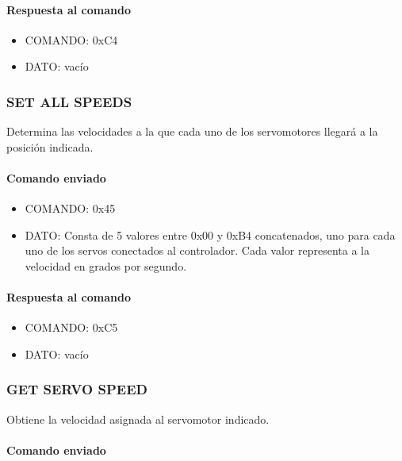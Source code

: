 \paragraph*{Respuesta al comando}

\begin{itemize}
	\item{COMANDO:} 0xC4
	\item{DATO:} vac\'io
\end{itemize}

\subsubsection{SET ALL SPEEDS}
\label{hA_protocolo_set_all_speeds}

Determina las velocidades a la que cada uno de los servomotores llegar\'a a la posici\'on indicada.

\paragraph*{Comando enviado}

\begin{itemize}
	\item{COMANDO:} 0x45
	\item{DATO:} Consta de 5 valores entre 0x00 y 0xB4 concatenados, uno para cada uno de los servos conectados al controlador.
	Cada valor representa a la velocidad en grados por segundo.
\end{itemize}

\paragraph*{Respuesta al comando}

\begin{itemize}
	\item{COMANDO:} 0xC5
	\item{DATO:} vac\'io
\end{itemize}

\subsubsection{GET SERVO SPEED}
\label{hA_protocolo_get_servo_speed}

Obtiene la velocidad asignada al servomotor indicado.

\paragraph*{Comando enviado}


